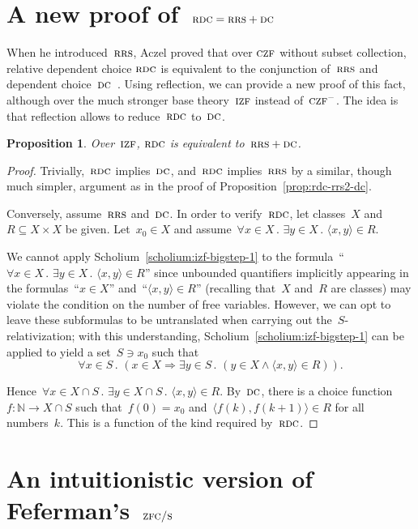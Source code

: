 \documentclass[oneside,reqno]{amsart}
\theoremstyle{definition}
\theoremstyle{plain}
\newtheorem{prop}[defn]{Proposition}
\theoremstyle{remark}
\newcommand{\NN}{\mathbb{N}}
\renewcommand{\_}{\mathpunct{.}\,}
\newcommand{\?}{\,{:}\,}
\newcommand{\IZF}{\textsc{izf}}
\newcommand{\CZF}{\textsc{czf}}
\newcommand{\ZFCS}{\textsc{zfc/s}}
\newcommand{\RRS}{\textsc{rrs}}
\newcommand{\RDC}{\textsc{rdc}}
\newcommand{\DC}{\textsc{dc}}
\begin{document}
\section{A new proof of~$\RDC = \RRS + \DC$}
\label{sect:appl-rdc}

When he introduced~$\RRS$, Aczel proved that over $\CZF$ without subset
collection, relative dependent choice $\RDC$ is equivalent to the conjunction
of~$\RRS$ and dependent choice~$\DC$~\cite[Theorem~2.4]{aczel:rrs}. Using
reflection, we can provide a new proof of this fact, although over the much
stronger base theory~$\IZF$ instead of~$\CZF^{-}$. The idea is that reflection
allows to reduce~$\RDC$ to~$\DC$.

\begin{prop}Over~$\IZF$, $\RDC$ is equivalent to~$\RRS + \DC$.
\end{prop}

\begin{proof}Trivially,~$\RDC$ implies~$\DC$, and~$\RDC$ implies~$\RRS$ by a
similar, though much simpler, argument as in the proof of
Proposition~\ref{prop:rdc-rrs2-dc}.

Conversely, assume~$\RRS$ and~$\DC$. In order to verify~$\RDC$, let classes~$X$
and~$R \subseteq X \times X$ be given. Let~$x_0 \in X$ and assume~$\forall x
\in X\_ \exists y \in X\_ \langle x,y \rangle \in R$.

We cannot apply Scholium~\ref{scholium:izf-bigstep-1} to the formula~``$\forall
x \in X\_ \exists y \in X\_ \langle x,y \rangle \in R$'' since unbounded
quantifiers implicitly appearing in the formulas~``$x \in X$'' and~``$\langle
x,y \rangle \in R$'' (recalling that~$X$ and~$R$ are classes) may violate the
condition on the number of free variables. However, we can opt to leave these
subformulas to be untranslated when carrying out the~$S$-relativization; with
this understanding, Scholium~\ref{scholium:izf-bigstep-1} can be applied to
yield a set~$S \ni x_0$ such that
\[ \forall x \in S\_ (x \in X \Rightarrow \exists y \in S\_
  (y \in X \wedge \langle x,y \rangle \in R)). \]

Hence~$\forall x \in X \cap S\_ \exists y \in X \cap S\_ \langle x,y \rangle
\in R$. By~$\DC$, there is a choice function~$f : \NN \to X \cap S$ such
that~$f(0) = x_0$ and~$\langle f(k), f(k+1) \rangle \in R$ for all numbers~$k$.
This is a function of the kind required by~$\RDC$.
\end{proof}


\section{An intuitionistic version of Feferman's~$\ZFCS$}
\label{sect:appl-smallness}
\end{document}
